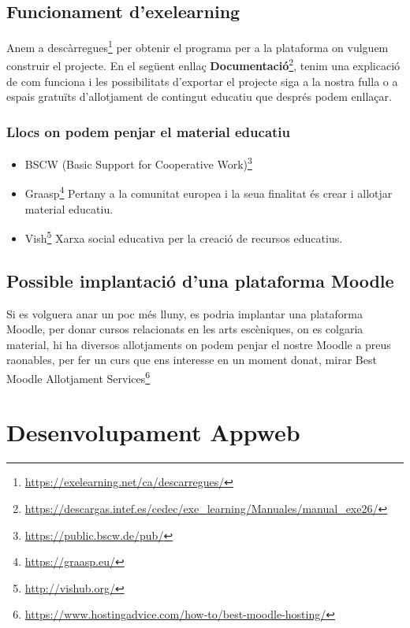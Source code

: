 \documentclass[
  10pt,
]{krantz}
\DeclareRobustCommand{\href}[2]{#2\footnote{\url{#1}}}
\providecommand{\tightlist}{%
  \setlength{\itemsep}{0pt}\setlength{\parskip}{0pt}}
\begin{document}
\hypertarget{funcionament-dexelearning}{%
\section{Funcionament d'exelearning}\label{funcionament-dexelearning}}

Anem a \href{https://exelearning.net/ca/descarregues/}{descàrregues} per obtenir el programa per a la plataforma on vulguem construir el projecte. En el següent enllaç \href{https://descargas.intef.es/cedec/exe_learning/Manuales/manual_exe26/}{\textbf{Documentació}}, tenim una explicació de com funciona i les possibilitats d'exportar el projecte siga a la nostra fulla o a espais gratuïts d'allotjament de contingut educatiu que després podem enllaçar.

\hypertarget{llocs-on-podem-penjar-el-material-educatiu}{%
\subsection{Llocs on podem penjar el material educatiu}\label{llocs-on-podem-penjar-el-material-educatiu}}

\begin{itemize}
\tightlist
\item
  \href{https://public.bscw.de/pub/}{BSCW (Basic Support for Cooperative Work)}
\item
  \href{https://graasp.eu/}{Graasp} Pertany a la comunitat europea i la seua finalitat és crear i allotjar material educatiu.
\item
  \href{http://vishub.org/}{Vish} Xarxa social educativa per la creació de recursos educatius.
\end{itemize}

\hypertarget{possible-implantaciuxf3-duna-plataforma-moodle}{%
\section{Possible implantació d'una plataforma Moodle}\label{possible-implantaciuxf3-duna-plataforma-moodle}}

Si es volguera anar un poc més lluny, es podria implantar una plataforma Moodle, per donar cursos relacionats en les arts escèniques, on es colgaria material, hi ha diversos allotjaments on podem penjar el nostre Moodle a preus raonables, per fer un curs que ens interesse en un moment donat, mirar \href{https://www.hostingadvice.com/how-to/best-moodle-hosting/}{Best Moodle Allotjament Services}

\hypertarget{desenvolupament-appweb}{%
\chapter{Desenvolupament Appweb}\label{desenvolupament-appweb}}
\end{document}
